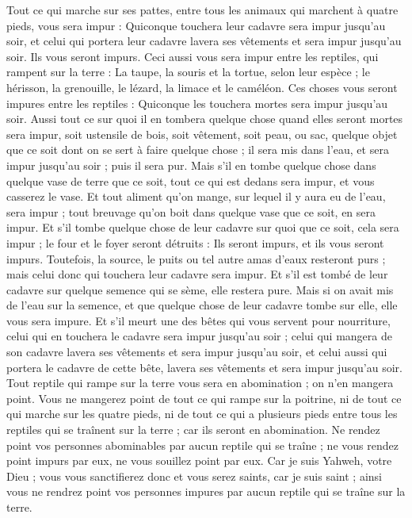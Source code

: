 \begin{multicols}{2}
Tout ce qui marche sur ses pattes, entre tous les animaux qui marchent à quatre pieds, vous sera impur : Quiconque touchera leur cadavre sera impur jusqu'au soir,
et celui qui portera leur cadavre lavera ses vêtements et sera impur jusqu'au soir. Ils vous seront impurs.
Ceci aussi vous sera impur entre les reptiles, qui rampent sur la terre : La taupe, la souris et la tortue, selon leur espèce ;
le hérisson, la grenouille, le lézard, la limace et le caméléon.
Ces choses vous seront impures entre les reptiles : Quiconque les touchera mortes sera impur jusqu'au soir.
Aussi tout ce sur quoi il en tombera quelque chose quand elles seront mortes sera impur, soit ustensile de bois, soit vêtement, soit peau, ou sac, quelque objet que ce soit dont on se sert à faire quelque chose ; il sera mis dans l'eau, et sera impur jusqu'au soir ; puis il sera pur.
Mais s'il en tombe quelque chose dans quelque vase de terre que ce soit, tout ce qui est dedans sera impur, et vous casserez le vase.
Et tout aliment qu'on mange, sur lequel il y aura eu de l'eau, sera impur ; tout breuvage qu'on boit dans quelque vase que ce soit, en sera impur.
Et s'il tombe quelque chose de leur cadavre sur quoi que ce soit, cela sera impur ; le four et le foyer seront détruits : Ils seront impurs, et ils vous seront impurs.
Toutefois, la source, le puits ou tel autre amas d'eaux resteront purs ; mais celui donc qui touchera leur cadavre sera impur.
Et s'il est tombé de leur cadavre sur quelque semence qui se sème, elle restera pure.
Mais si on avait mis de l'eau sur la semence, et que quelque chose de leur cadavre tombe sur elle, elle vous sera impure.
Et s’il meurt une des bêtes qui vous servent pour nourriture, celui qui en touchera le cadavre sera impur jusqu'au soir ;
celui qui mangera de son cadavre lavera ses vêtements et sera impur jusqu'au soir, et celui aussi qui portera le cadavre de cette bête, lavera ses vêtements et sera impur jusqu'au soir.
Tout reptile qui rampe sur la terre vous sera en abomination ; on n'en mangera point.
Vous ne mangerez point de tout ce qui rampe sur la poitrine, ni de tout ce qui marche sur les quatre pieds, ni de tout ce qui a plusieurs pieds entre tous les reptiles qui se traînent sur la terre ; car ils seront en abomination.
Ne rendez point vos personnes abominables par aucun reptile qui se traîne ; ne vous rendez point impurs par eux, ne vous souillez point par eux.
Car je suis Yahweh, votre Dieu ; vous vous sanctifierez donc et vous serez saints, car je suis saint ; ainsi vous ne rendrez point vos personnes impures par aucun reptile qui se traîne sur la terre.

\end{multicols}
